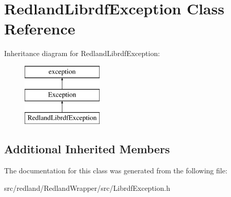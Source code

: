 \hypertarget{classRedlandLibrdfException}{}\section{Redland\+Librdf\+Exception Class Reference}
\label{classRedlandLibrdfException}
Inheritance diagram for Redland\+Librdf\+Exception\+:\begin{figure}[H]
\begin{center}
\leavevmode
\includegraphics[height=3.000000cm]{classRedlandLibrdfException}
\end{center}
\end{figure}
\subsection*{Additional Inherited Members}


The documentation for this class was generated from the following file\+:\begin{DoxyCompactItemize}
\item 
src/redland/\+Redland\+Wrapper/src/Librdf\+Exception.\+h\end{DoxyCompactItemize}
